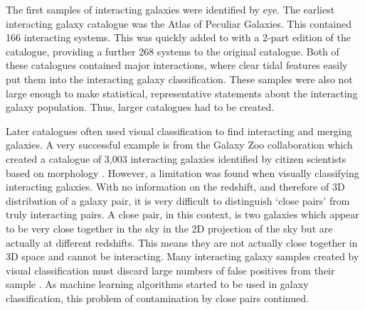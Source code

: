 The first samples of interacting galaxies were identified by eye. The earliest interacting galaxy catalogue was the \citet{1966ApJS...14....1A} Atlas of Peculiar Galaxies. This contained 166 interacting systems. This was quickly added to with a 2-part edition of the \citet{1977A&AS...28....1V} catalogue, providing a further 268 systems to the original \citet{1966ApJS...14....1A} catalogue. Both of these catalogues contained major interactions, where clear tidal features easily put them into the interacting galaxy classification. These samples were also not large enough to make statistical, representative statements about the interacting galaxy population. Thus, larger catalogues had to be created.

Later catalogues often used visual classification to find interacting and merging galaxies. A very successful example is from the Galaxy Zoo collaboration which created a catalogue of 3,003 interacting galaxies identified by citizen scientists based on morphology \citep{2010MNRAS.401.1043D}. However, a limitation was found when visually classifying interacting galaxies. With no information on the redshift, and therefore of 3D distribution of a galaxy pair, it is very difficult to distinguish `close pairs' from truly interacting pairs. A close pair, in this context, is two galaxies which appear to be very close together in the sky in the 2D projection of the sky but are actually at different redshifts. This means they are not actually close together in 3D space and cannot be interacting. Many interacting galaxy samples created by visual classification must discard large numbers of false positives from their sample \citep{2020MNRAS.492.2075B, 2022A&A...661A..52P}. As machine learning algorithms started to be used in galaxy classification, this problem of contamination by close pairs continued.

